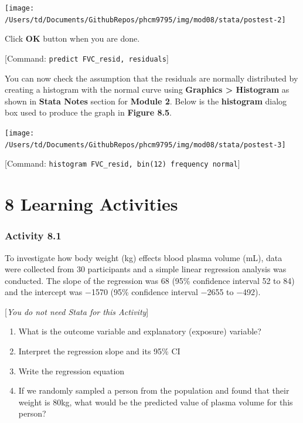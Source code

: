 \documentclass[
]{memoir}
\providecommand{\tightlist}{%
  \setlength{\itemsep}{0pt}\setlength{\parskip}{0pt}}
\begin{document}
\texttt{[image: /Users/td/Documents/GithubRepos/phcm9795/img/mod08/stata/postest-2]}

Click \textbf{OK} button when you are done.

{[}Command: \texttt{predict\ FVC\_resid,\ residuals}{]}

You can now check the assumption that the residuals are normally distributed by creating a histogram with the normal curve using \textbf{Graphics \textgreater{} Histogram} as shown in \textbf{Stata Notes} section for \textbf{Module 2}. Below is the \textbf{histogram} dialog box used to produce the graph in \textbf{Figure 8.5}.

\texttt{[image: /Users/td/Documents/GithubRepos/phcm9795/img/mod08/stata/postest-3]}

{[}Command: \texttt{histogram\ FVC\_resid,\ bin(12)\ frequency\ normal}{]}

\hypertarget{learning-activities-7}{%
\chapter*{\texorpdfstring{\textbf{8} Learning Activities}{8 Learning Activities}}\label{learning-activities-7}}

\hypertarget{activity-8.1}{%
\subsection*{Activity 8.1}\label{activity-8.1}}

To investigate how body weight (kg) effects blood plasma volume (mL), data were collected from 30 participants and a simple linear regression analysis was conducted. The slope of the regression was 68 (95\% confidence interval 52 to 84) and the intercept was −1570 (95\% confidence interval −2655 to −492).

{[}\emph{You do not need Stata for this Activity}{]}

\begin{enumerate}
\def\labelenumi{\alph{enumi})}
\tightlist
\item
  What is the outcome variable and explanatory (exposure) variable?
\item
  Interpret the regression slope and its 95\% CI
\item
  Write the regression equation
\item
  If we randomly sampled a person from the population and found that their weight is 80kg, what would be the predicted value of plasma volume for this person?
\end{enumerate}
\end{document}
